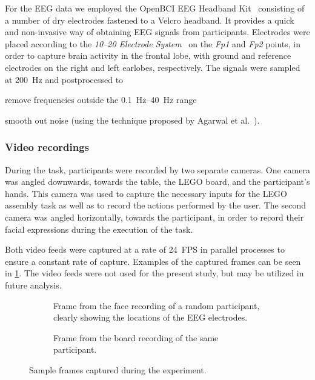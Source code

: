 For the EEG data we employed the OpenBCI EEG Headband Kit~\cite{openbci:headbandkit} consisting of a number of dry electrodes fastened to a Velcro headband.
It provides a quick and non-invasive way of obtaining EEG signals from participants.
Electrodes were placed according to the \emph{10--20 Electrode System}~\cite{eeg1020system:1961} on the \emph{Fp1} and \emph{Fp2} points, in order to capture brain activity in the frontal lobe, with ground and reference electrodes on the right and left earlobes, respectively.
The signals were sampled at \SI{200}{\hertz} and postprocessed to 
\begin{enumerate*}[itemjoin={{, }},
                  itemjoin*={{, and }},
                  label={{(\arabic*)}}]
  \item remove frequencies outside the \SIrange{0.1}{40}{\hertz} range
  \item smooth out noise (using the technique proposed by Agarwal et al.~\cite{agarwal2017eeg}).
\end{enumerate*}

\subsubsection{Video recordings}

During the task, participants were recorded by two separate cameras.
One camera was angled downwards, towards the table, the LEGO board, and the participant's hands.
This camera was used to capture the necessary inputs for the LEGO assembly task as well as to record the actions performed by the user.
The second camera was angled horizontally, towards the participant, in order to record their facial expressions during the execution of the task.

Both video feeds were captured at a rate of \num{24}~FPS in parallel processes to ensure a constant rate of capture.
Examples of the captured frames can be seen in \cref{fig:sampleframes}.
The video feeds were not used for the present study, but may be utilized in future analysis.

\begin{figure}[h]
  \centering
  \begin{subfigure}[t]{.35\textwidth}
    \centering
    \caption{Frame from the face recording of a random participant, clearly showing the locations of the EEG electrodes.}
  \end{subfigure}%
  \hfill%
  \begin{subfigure}[t]{.60\textwidth}
    \centering
    \caption{Frame from the board recording of the same participant.}
  \end{subfigure}
  \caption{Sample frames captured during the experiment.}\label{fig:sampleframes}
\end{figure}

